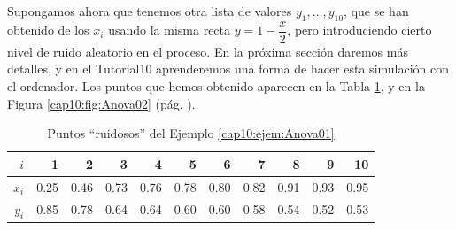 \begin{ejemplo}
Supongamos ahora que tenemos otra lista de valores $y_1,\ldots, y_{10}$, que se han obtenido de los $x_i$ usando la misma recta $y=1-\dfrac{x}{2}$, pero introduciendo cierto nivel de ruido aleatorio en el proceso. En la próxima sección daremos más detalles, y en el Tutorial10 aprenderemos una forma de hacer esta simulación con el ordenador. Los puntos que hemos obtenido aparecen en la Tabla \ref{cap10:tabla:Anova01ruidosos}, y en la Figura \ref{cap10:fig:Anova02} (pág. \pageref{cap10:fig:Anova02}).

\begin{table}[ht]
\centering
\begin{tabular}{rrrrrrrrrrr}
  \hline
$i$ & 1 & 2 & 3 & 4 & 5 & 6 & 7 & 8 & 9 & 10 \\
  \hline
$x_i$ & 0.25 & 0.46 & 0.73 & 0.76 & 0.78 & 0.80 & 0.82 & 0.91 & 0.93 & 0.95 \\
$y_i$ & 0.85 & 0.78 & 0.64 & 0.64 & 0.60 & 0.60 & 0.58 & 0.54 & 0.52 & 0.53 \\
   \hline
\end{tabular}
\caption{Puntos ``ruidosos'' del Ejemplo \ref{cap10:ejem:Anova01}}
\label{cap10:tabla:Anova01ruidosos}
\end{table}


\end{ejemplo}
